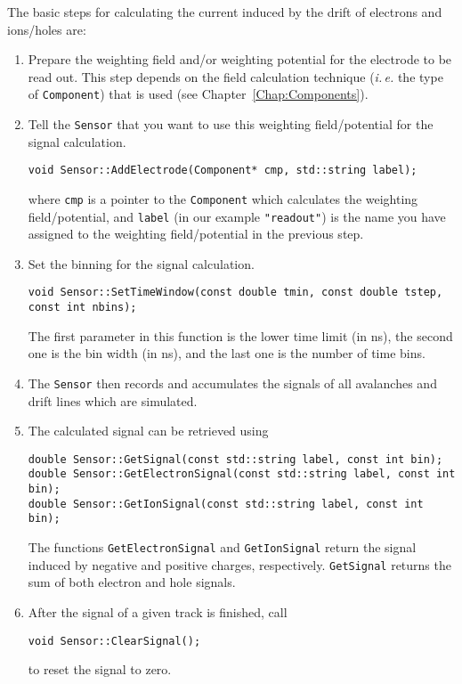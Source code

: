 The basic steps for calculating the current induced 
by the drift of electrons and ions/holes are:
\begin{enumerate}
  \item
  Prepare the weighting field and/or weighting potential 
  for the electrode to be read out. 
  This step depends on the field calculation technique 
  (\textit{i.\,e.} the type of \texttt{Component}) that is used 
  (see Chapter~\ref{Chap:Components}). 
  \item
  Tell the \texttt{Sensor} that you want to use this 
  weighting field/potential for the signal calculation. 
\begin{lstlisting}
void Sensor::AddElectrode(Component* cmp, std::string label);
\end{lstlisting}
  where \texttt{cmp} is a pointer to the \texttt{Component} 
  which calculates the weighting field/potential, and \texttt{label} 
  (in our example \texttt{"readout"}) is the name 
  you have assigned to the weighting field/potential in the previous step.
  \item
  Set the binning for the signal calculation.
\begin{lstlisting}
void Sensor::SetTimeWindow(const double tmin, const double tstep, const int nbins);
\end{lstlisting}
  The first parameter in this function is the lower time limit (in ns), 
  the second one is the bin width (in ns), and the last one 
  is the number of time bins.
  \item
  The \texttt{Sensor} then records and accumulates the signals of all 
  avalanches and drift lines which are simulated.
  \item
  The calculated signal can be retrieved using 
\begin{lstlisting}
double Sensor::GetSignal(const std::string label, const int bin);
double Sensor::GetElectronSignal(const std::string label, const int bin);
double Sensor::GetIonSignal(const std::string label, const int bin); 
\end{lstlisting}
  The functions \texttt{GetElectronSignal} and 
  \texttt{GetIonSignal} return the signal induced by negative 
  and positive charges, respectively. \texttt{GetSignal} returns 
  the sum of both electron and hole signals.   
  \item
  After the signal of a given track is finished, call
\begin{lstlisting}
void Sensor::ClearSignal();
\end{lstlisting}
  to reset the signal to zero.
\end{enumerate}

